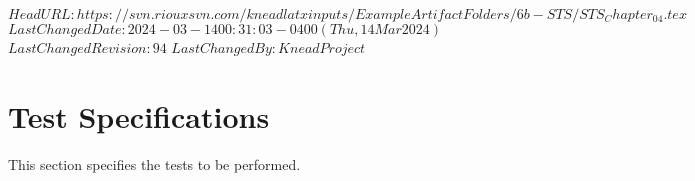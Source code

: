 \svnidlong
{$HeadURL: https://svn.riouxsvn.com/kneadlatxinputs/ExampleArtifactFolders/6b-STS/STS_Chapter_04.tex $}
{$LastChangedDate: 2024-03-14 00:31:03 -0400 (Thu, 14 Mar 2024) $}
{$LastChangedRevision: 94 $}
{$LastChangedBy: KneadProject $}

\chapter{Test Specifications}
\label{loc:TestSpecifications}
% 

This section specifies the tests to be performed.
\newcommand{\StsTestCaseID}{Packets}%

\newcommand{\StsTestSpecID}{WiFi Test}%


\DIDINFOON%
